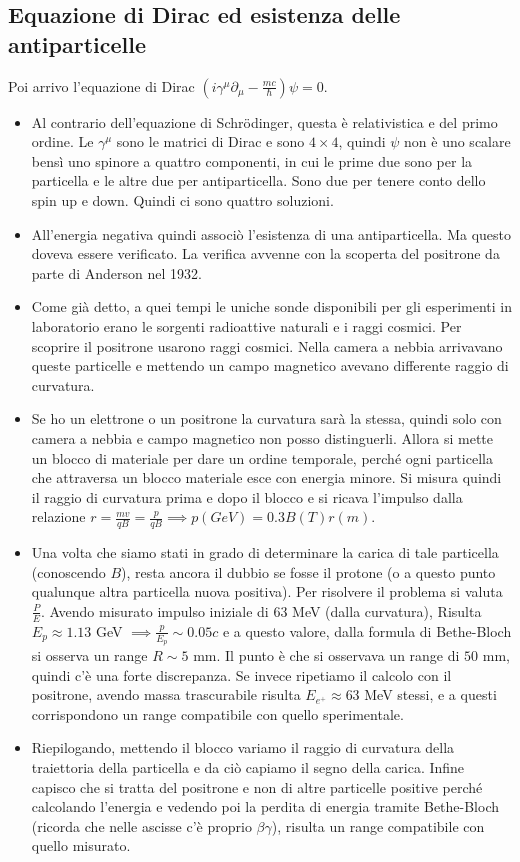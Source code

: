 \subsection{Equazione di Dirac ed esistenza delle antiparticelle}
Poi arrivo l'equazione di Dirac $(i\gamma^\mu\partial_\mu-\frac{mc}{\hbar})\psi=0$.
\begin{itemize}
    \item Al contrario dell'equazione di Schrödinger, questa è relativistica e del primo ordine. Le $\gamma^\mu$ sono le matrici di Dirac e sono $4\times 4$, quindi $\psi$ non è uno scalare bensì uno spinore a quattro componenti, in cui le prime due sono per la particella e le altre due per antiparticella. Sono due per tenere conto dello spin up e down. Quindi ci sono quattro soluzioni.
    \item All'energia negativa quindi associò l'esistenza di una antiparticella. Ma questo doveva essere verificato. La verifica avvenne con la scoperta del positrone da parte di Anderson nel 1932.
    \item Come già detto, a quei tempi le uniche sonde disponibili per gli esperimenti in laboratorio erano le sorgenti radioattive naturali e i raggi cosmici. Per scoprire il positrone usarono raggi cosmici. Nella camera a nebbia arrivavano queste particelle e mettendo un campo magnetico avevano differente raggio di curvatura. 
    \item Se ho un elettrone o un positrone la curvatura sarà la stessa, quindi solo con camera a nebbia e campo magnetico non posso distinguerli. Allora si mette un blocco di materiale per dare un ordine temporale, perché ogni particella che attraversa un blocco materiale esce con energia minore. Si misura quindi il raggio di curvatura prima e dopo il blocco e si ricava l'impulso dalla relazione $r=\frac{mv}{qB}=\frac{p}{qB}\implies p(GeV)=0.3 B(T)r(m)$. 
    \item Una volta che siamo stati in grado di determinare la carica di tale particella (conoscendo $B$), resta ancora il dubbio se fosse il protone (o a questo punto qualunque altra particella nuova positiva). Per risolvere il problema si valuta $\frac P E$. Avendo misurato impulso iniziale di $63$ MeV (dalla curvatura), Risulta $E_p\approx 1.13$ GeV $\implies \frac p {E_p} \sim 0.05c$ e a questo valore, dalla formula di Bethe-Bloch si osserva un range $R\sim5$ mm. Il punto è che si osservava un range di $50$ mm, quindi c'è una forte discrepanza. Se invece ripetiamo il calcolo con il positrone, avendo massa trascurabile risulta $E_{e^+}\approx 63$ MeV stessi, e a questi corrispondono un range compatibile con quello sperimentale.
    \item Riepilogando, mettendo il blocco variamo il raggio di curvatura della traiettoria della particella e da ciò capiamo il segno della carica. Infine capisco che si tratta del positrone e non di altre particelle positive perché calcolando l'energia e vedendo poi la perdita di energia tramite Bethe-Bloch (ricorda che nelle ascisse c'è proprio $\beta\gamma$), risulta un range compatibile con quello misurato. 
\end{itemize}
